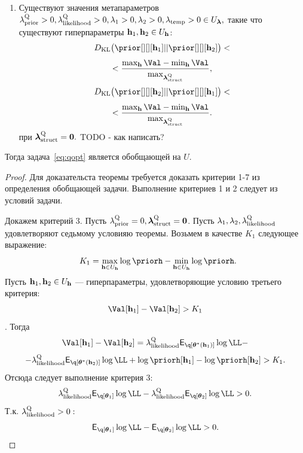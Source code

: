 \begin{theorem}
\begin{enumerate}
\item Существуют значения метапараметров $\lambda_\text{prior}^\text{Q}>0,\lambda_\text{likelihood}^\text{Q}>0, \lambda_1>0, \lambda_2>0, \lambda_{\text{temp}}>0  \in U_{\boldsymbol{\lambda}},$ такие что существуют гиперпараметры $\mathbf{h}_1, \mathbf{h}_2 \in U_{\mathbf{h}}$:
\[
\KL{\prior[][][\h_1]}{\prior[][][\h_2]} < 
\]
\[
<\frac{\max_{\h} \Val - \min_{\h} \Val }{\max_{\lamS}},
\]
\[
\KL{\prior[][][\h_2]}{\prior[][][\h_1]} <
\]
\[
< \frac{\max_{\h} \Val - \min_{\h} \Val }{\max_{\lamS}}.
\]
при $\boldsymbol{\lambda}_\text{struct}^\text{Q} = \mathbf{0}.$
TODO - как написать?
\end{enumerate}
Тогда задача~\eqref{eq:qopt} является обобщающей на $U$.
\end{theorem}

\begin{proof}
Для доказательста теоремы требуется доказать критерии 1-7 из определения обобщающей задачи.
Выполнение критериев 1 и 2 следует из условий задачи.

Докажем критерий 3. 
Пусть $\lambda_\text{prior}^\text{Q} = 0, \boldsymbol{\lambda}_\text{struct}^\text{Q} = \mathbf{0}$. 
Пусть $\lambda_1, \lambda_2, \lambda_\text{likelihood}^\text{Q}$ удовлетворяют седьмому условияю теоремы.
Возьмем в качестве $K_1$ следующее выражение:
\[
    K_1= \max_{\h \in \Uh} \log \priorh-\min_{\h \in \Uh} \log \priorh.
\]
Пусть $\mathbf{h}_1, \mathbf{h}_2 \in U_{\mathbf{h}}$ --- гиперпараметры, удовлетворяющие условию третьего критерия:
$$ \Val[\h_1] - \Val[\h_2]>K_1$$.
Тогда 
\[
\Val[\h_1] - \Val[\h_2] = \lamLL \E_{\q[\teta^{*}(\h_1)]} \log \LL - 
\]
\[
- \lamLL \E_{\q[\teta^{*}(\h_2)]} \log \LL + \log\priorh[\h_1] - \log\priorh[\h_2]>K_1.
\]
Отсюда следует  выполнение критерия 3:
\[
\lamLL \E_{\q[\teta_1]} \log \LL - \lamLL  \E_{\q[\teta_2]} \log \LL   >0.
\]
Т.к. $\lambda_\text{likelihood}^\text{Q} > 0:$
\[
\E_{\q[\teta_1]} \log \LL -  \E_{\q[\teta_2]} \log \LL   >0.
\]



\end{proof}
